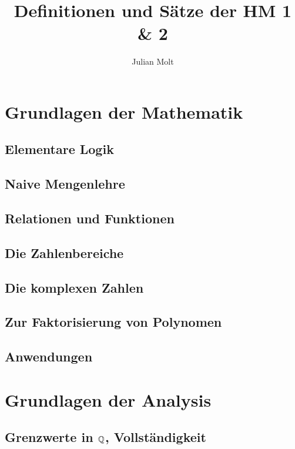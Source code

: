 \documentclass[11pt,a4paper]{report}
\title{\sffamily \textbf{\Huge Definitionen und Sätze der HM 1 \& 2}}
\author{\sffamily \huge{Julian Molt}}
\date{}
\begin{document}
\maketitle
\newpage%
\tableofcontents
\pagebreak

\chapter{Grundlagen der Mathematik}
\section{Elementare Logik}
\section{Naive Mengenlehre}
\section{Relationen und Funktionen}
\section{Die Zahlenbereiche}
\section{Die komplexen Zahlen}
\section{Zur Faktorisierung von Polynomen}

\section{Anwendungen}


\chapter{Grundlagen der Analysis}
\section{\texorpdfstring{Grenzwerte in \(\QQ\), Vollständigkeit}{Grenzwerte in Q, Vollständigkeit}}
\end{document}
